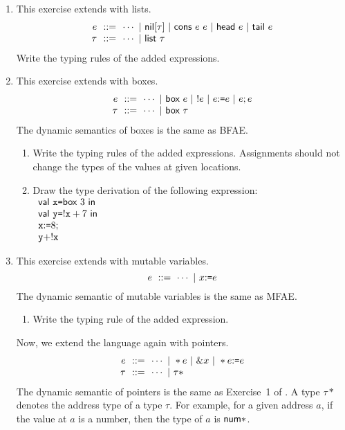 \begin{enumerate}
\item This exercise extends \lang with lists.
  \[
    \begin{array}{r@{~~}r@{~~}l}
      e & ::= & \cdots
      \ |\ \textsf{nil}[\tau]
      \ |\ \textsf{cons}\ e\ e
      \ |\ \textsf{head}\ e
      \ |\ \textsf{tail}\ e \\
      \tau & ::= & \cdots\ |\ \textsf{list}\ \tau \\
    \end{array}
  \]
Write the typing rules of the added expressions.

\item This exercise extends \lang with boxes.
  \[
    \begin{array}{r@{~~}r@{~~}l}
      e & ::= & \cdots
      \ |\ \eref{e}
      \ |\ \ederef{e}
      \ |\ \eset{e}{e}
      \ |\ \eseq{e}{e} \\
      \tau & ::= & \cdots\ |\ \textsf{box}\ \tau \\
    \end{array}
  \]
      The dynamic semantics of boxes is the same as \textsf{BFAE}.
\begin{enumerate}
  \item Write the typing rules of the added expressions.
  Assignments should not change the types of the values at given locations.
  \item Draw the type derivation of the following expression:\\
  $
  \begin{array}{l}
    \ebind{\cx}{\eref{3}}{\\
    \ebind{\cy}{\ederef{\cx}+7}{\\
    \eseq{\eset{\cx}{8}}{\\
    \cy+\ederef{\cx}
    }}}
  \end{array}
  $
\end{enumerate}

\item This exercise extends \lang with mutable variables.
  \[ e\ ::=\ \cdots\ |\ \eset{x}{e} \]
    The dynamic semantic of mutable variables is the same as \textsf{MFAE}.
\begin{enumerate}
  \item Write the typing rule of the added expression.
\end{enumerate}
Now, we extend the language again with pointers.
\[
  \begin{array}{r@{~~}r@{~~}l}
    e & ::= & \cdots\ |\ \ast e \ |\ \& x\ |\ \ast\eset{e}{e} \\
    \tau & ::= & \cdots\ |\ \tau\ast
  \end{array}
\]
The dynamic semantic of pointers is the same as Exercise~1 of
.
A type $\tau\ast$ denotes the address type of a type $\tau$.
For example, for a given address $a$, if the value at $a$ is a number,
then the type of $a$ is $\tnum\ast$.


\end{enumerate}
